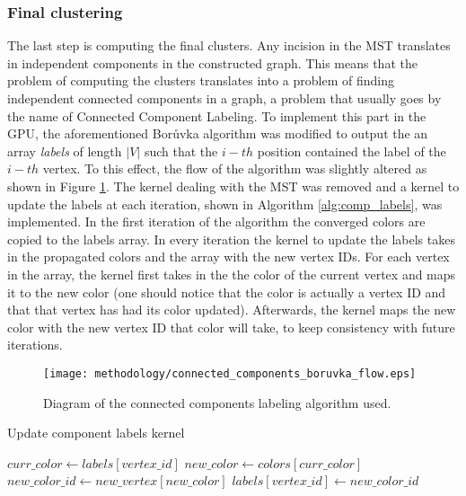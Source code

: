 \subsubsection{Final clustering}
The last step is computing the final clusters.
Any incision in the MST translates in independent components in the constructed graph.
This means that the problem of computing the clusters translates into a problem of finding independent connected components in a graph, a problem that usually goes by the name of Connected Component Labeling.
To implement this part in the GPU, the aforementioned Borůvka algorithm was modified to output the an array \emph{labels} of length $|V|$ such that the $i-th$ position contained the label of the $i-th$ vertex.
To this effect, the flow of the algorithm was slightly altered as shown in Figure \ref{fig:connected comps flow}. 
The kernel dealing with the MST was removed and a kernel to update the labels at each iteration, shown in Algorithm \ref{alg:comp_labels}, was implemented.
In the first iteration of the algorithm the converged colors are copied to the labels array.
In every iteration the kernel to update the labels takes in the propagated colors and the array with the new vertex IDs.
For each vertex in the array, the kernel first takes in the the color of the current vertex and maps it to the new color (one should notice that the color is actually a vertex ID and that that vertex has had its color updated).
Afterwards, the kernel maps the new color with the new vertex ID that color will take, to keep consistency with future iterations.

\begin{figure}[hbtp]
\centering
\texttt{[image: methodology/connected\_components\_boruvka\_flow.eps]}
\caption{Diagram of the connected components labeling algorithm used.}
\label{fig:connected comps flow}
\end{figure}


%
%


\begin{algorithm}
\caption{Update component labels kernel}\label{alg:comp_labels}
\begin{algorithmic}[1]
\State $curr\_color \gets labels[vertex\_id]$
\State $new\_color \gets colors[curr\_color]$
\State $new\_color\_id \gets new\_vertex[new\_color]$
\State $labels[vertex\_id] \gets new\_color\_id$
\EndProcedure
\end{algorithmic}
\end{algorithm}



